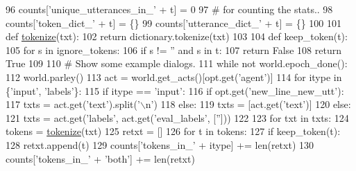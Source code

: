 \begin{DoxyCode}
96         counts[\textcolor{stringliteral}{'unique\_utterances\_in\_'} + t] = 0
97         \textcolor{comment}{# for counting the stats..}
98         counts[\textcolor{stringliteral}{'token\_dict\_'} + t] = \{\}
99         counts[\textcolor{stringliteral}{'utterance\_dict\_'} + t] = \{\}
100 
101     \textcolor{keyword}{def }\hyperlink{namespaceparlai_1_1agents_1_1tfidf__retriever_1_1build__tfidf_a1fdb457e98eb4e4c26047e229686a616}{tokenize}(txt):
102         \textcolor{keywordflow}{return} dictionary.tokenize(txt)
103 
104     \textcolor{keyword}{def }keep\_token(t):
105         \textcolor{keywordflow}{for} s \textcolor{keywordflow}{in} ignore\_tokens:
106             \textcolor{keywordflow}{if} s != \textcolor{stringliteral}{''} \textcolor{keywordflow}{and} s \textcolor{keywordflow}{in} t:
107                 \textcolor{keywordflow}{return} \textcolor{keyword}{False}
108         \textcolor{keywordflow}{return} \textcolor{keyword}{True}
109 
110     \textcolor{comment}{# Show some example dialogs.}
111     \textcolor{keywordflow}{while} \textcolor{keywordflow}{not} world.epoch\_done():
112         world.parley()
113         act = world.get\_acts()[opt.get(\textcolor{stringliteral}{'agent'})]
114         \textcolor{keywordflow}{for} itype \textcolor{keywordflow}{in} \{\textcolor{stringliteral}{'input'}, \textcolor{stringliteral}{'labels'}\}:
115             \textcolor{keywordflow}{if} itype == \textcolor{stringliteral}{'input'}:
116                 \textcolor{keywordflow}{if} opt.get(\textcolor{stringliteral}{'new\_line\_new\_utt'}):
117                     txts = act.get(\textcolor{stringliteral}{'text'}).split(\textcolor{stringliteral}{'\(\backslash\)n'})
118                 \textcolor{keywordflow}{else}:
119                     txts = [act.get(\textcolor{stringliteral}{'text'})]
120             \textcolor{keywordflow}{else}:
121                 txts = act.get(\textcolor{stringliteral}{'labels'}, act.get(\textcolor{stringliteral}{'eval\_labels'}, [\textcolor{stringliteral}{''}]))
122 
123             \textcolor{keywordflow}{for} txt \textcolor{keywordflow}{in} txts:
124                 tokens = \hyperlink{namespaceparlai_1_1agents_1_1tfidf__retriever_1_1build__tfidf_a1fdb457e98eb4e4c26047e229686a616}{tokenize}(txt)
125                 retxt = []
126                 \textcolor{keywordflow}{for} t \textcolor{keywordflow}{in} tokens:
127                     \textcolor{keywordflow}{if} keep\_token(t):
128                         retxt.append(t)
129                 counts[\textcolor{stringliteral}{'tokens\_in\_'} + itype] += len(retxt)
130                 counts[\textcolor{stringliteral}{'tokens\_in\_'} + \textcolor{stringliteral}{'both'}] += len(retxt)

\end{DoxyCode}
